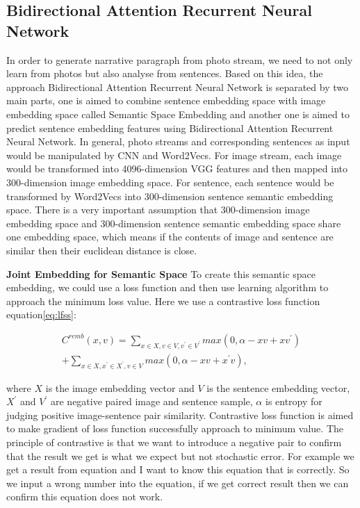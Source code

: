 \documentclass[11pt]{article}
\begin{document}
		
\subsection{Bidirectional Attention Recurrent Neural Network}
In order to generate narrative paragraph from photo stream, we need to not only learn from photos but also analyse from sentences. Based on this idea, the approach Bidirectional Attention Recurrent Neural Network is separated by two main parts, one is aimed to combine sentence embedding space with image embedding space called Semantic Space Embedding and another one is aimed to predict sentence embedding features using Bidirectional Attention Recurrent Neural Network. In general, photo streams and corresponding sentences as input would be manipulated by CNN and Word2Vecs. For image stream, each image would be transformed into 4096-dimension VGG features \cite{Simonyan14c}and then mapped into 300-dimension image embedding space. For sentence, each sentence would be transformed by Word2Vecs \cite{DBLP:journals/corr/MikolovSCCD13}into 300-dimension sentence semantic embedding space. There is a very important assumption that 300-dimension image embedding space and 300-dimension sentence semantic embedding space share one embedding space, which means if the contents of image and sentence are similar then their euclidean distance is close. 

{\bf Joint Embedding for Semantic Space}  To create this semantic space embedding, we could use a loss function and then use learning algorithm to approach the minimum loss value. Here we use a contrastive loss function equation\ref{eq:lfss}:

\begin{small}
\begin{equation}
\begin{aligned}
C^{remb}(x,v) = \sum_{x \in X, v \in V, v^{'} \in V^{'}} max(0, \alpha -xv + xv^{'}) \\
				 + \sum_{x \in X, x^{'} \in X^{'}, v \in V} max(0, \alpha -xv + x^{'}v),
\end{aligned}
\label{eq:lfss}
\end{equation}
\end{small}
where $X$ is the image embedding vector and $V$ is the sentence embedding vector, $X^{'}$ and $ V^{'}$ are negative paired image and sentence sample, $\alpha$ is entropy for judging positive image-sentence pair similarity. Contrastive loss function \cite{1467314} is aimed to make gradient of loss function successfully approach to minimum value. The principle of contrastive is that we want to introduce a negative pair to confirm that the result we get is what we expect but not stochastic error. For example we get a result from equation and I want to know this equation that is correctly. So we input a wrong number into the equation, if we get correct result then we can confirm this equation does not work. 
\end{document}
